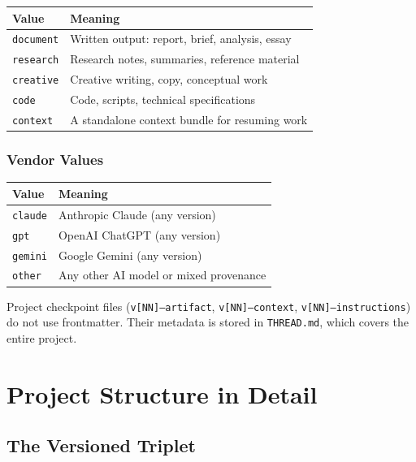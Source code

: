 \documentclass[12pt,letterpaper]{article}
\begin{document}
\begin{center}
\begin{tabular}{@{}ll@{}}
\toprule
\textbf{Value} & \textbf{Meaning} \\
\midrule
\texttt{document} & Written output: report, brief, analysis, essay \\
\texttt{research} & Research notes, summaries, reference material \\
\texttt{creative} & Creative writing, copy, conceptual work \\
\texttt{code} & Code, scripts, technical specifications \\
\texttt{context} & A standalone context bundle for resuming work \\
\bottomrule
\end{tabular}
\end{center}

\subsubsection{Vendor Values}

\begin{center}
\begin{tabular}{@{}ll@{}}
\toprule
\textbf{Value} & \textbf{Meaning} \\
\midrule
\texttt{claude} & Anthropic Claude (any version) \\
\texttt{gpt} & OpenAI ChatGPT (any version) \\
\texttt{gemini} & Google Gemini (any version) \\
\texttt{other} & Any other AI model or mixed provenance \\
\bottomrule
\end{tabular}
\end{center}

Project checkpoint files (\texttt{v[NN]--artifact}, \texttt{v[NN]--context},
\texttt{v[NN]--instructions}) do not use frontmatter. Their metadata is stored
in \texttt{THREAD.md}, which covers the entire project.

\section{Project Structure in Detail}

\subsection{The Versioned Triplet}
\end{document}
